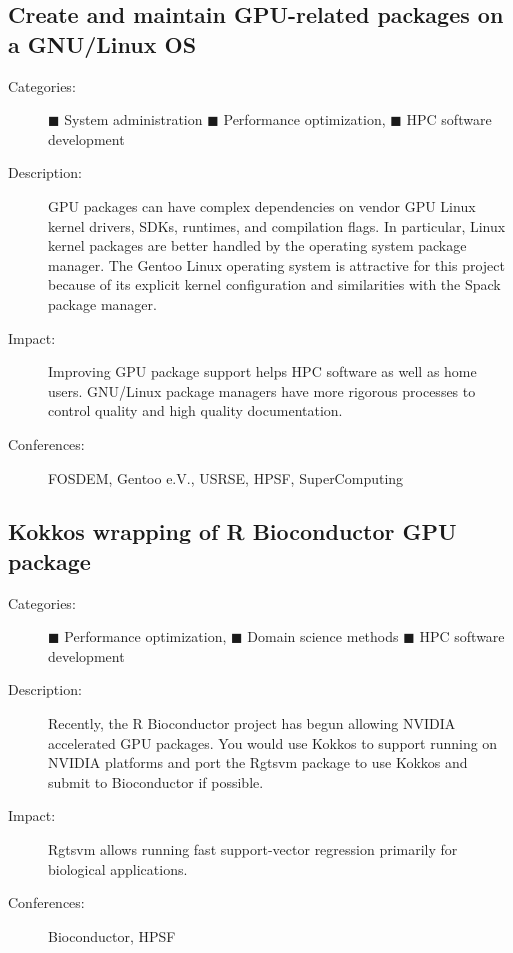 \documentclass[12pt]{article}
\begin{document}
\subsection{Create and maintain GPU-related packages on a GNU/Linux OS}
\begin{description}
\item[Categories:]
  \textcolor{black!60}{$\blacksquare$} System administration
  \textcolor{orange!90!black}{$\blacksquare$} Performance optimization,
  \textcolor{blue!80!black}{$\blacksquare$} HPC software development
\item[Description:] GPU packages can have complex dependencies %
  on vendor GPU Linux kernel drivers, SDKs, runtimes, and compilation flags.
  In particular, %
  Linux kernel packages %
  are better handled by the operating system package manager.
  The Gentoo Linux operating system %
  is attractive for this project %
  because of its explicit kernel configuration %
  and similarities with the Spack package manager.
\item[Impact:] Improving GPU package support helps HPC software %
  as well as home users.
  GNU/Linux package managers %
  have more rigorous processes to control quality %
  and high quality documentation.
\item[Conferences:] FOSDEM, Gentoo e.V., USRSE, HPSF, SuperComputing
\end{description}

\subsection{Kokkos wrapping of R Bioconductor GPU package}
\begin{description}
\item[Categories:]
  \textcolor{orange!90!black}{$\blacksquare$} Performance optimization,
  \textcolor{green!50!black}{$\blacksquare$} Domain science methods
  \textcolor{blue!80!black}{$\blacksquare$} HPC software development
\item[Description:] Recently, %
  the R Bioconductor project has begun allowing NVIDIA accelerated %
  GPU packages.
  You would use Kokkos to support running on NVIDIA platforms %
  and port the Rgtsvm package to use Kokkos %
  and submit to Bioconductor if possible.
\item[Impact:] Rgtsvm allows running fast support-vector regression %
  primarily for biological applications.
\item[Conferences:] Bioconductor, HPSF
\end{description}
\end{document}
